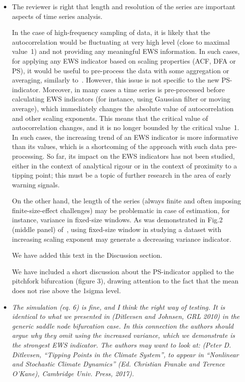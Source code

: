 \documentclass[12pt]{article}
\begin{document}
\begin{itemize}
\item[\bf Response.] 
The reviewer is right that length and resolution of the series are 
important aspects of time series analysis. 

In the case of high-frequency sampling
of data, it is likely that the autocorrelation would be fluctuating 
at very high level (close to maximal value~1) and not providing any 
meaningful EWS information. In such cases, for applying any EWS indicator
based on scaling properties (ACF, DFA or PS), it would be useful to 
pre-process the data with 
some aggregation or averaging, similarly to~\cite{held2004}. 
However, this issue is not specific to the 
new PS-indicator. Moreover, in many cases a time series is pre-processed 
before calculating EWS indicators (for instance, using Gaussian filter
or moving average), which immediately changes the absolute value of
autocorrelation and other scaling exponents. This means that the critical 
value of autocorrelation changes, and it is no longer bounded 
by the critical
value~1. In such cases, the increasing trend of an EWS indicator is more
informative than its values, which is a shortcoming of the approach with 
such data pre-processing. So far, its impact on the EWS 
indicators has not been studied, either in the context of analytical 
rigour or in the context of proximity to a tipping point; 
this must be a topic of further research in the area of 
early warning signals.

On the other hand, the length of the series (always
finite and often imposing finite-size-effect challenges) may be problematic
in case of estimation, for instance, variance in fixed-size windows. 
As was demonstrated in Fig.2 (middle panel) 
of~\cite{livina2012}, using
fixed-size window in studying a dataset with increasing scaling exponent 
may generate a decreasing variance indicator. 

We have added this text in the Discussion section. 

We have included a short discussion about the 
PS-indicator applied to the pitchfork bifurcation (figure 3), 
drawing attention to the fact that the mean does not rise above 
the 1sigma level.

\item[\bf Comment 3.]
{\sl 
The simulation (eq. 6) is fine, and I think the right way of testing. 
It is identical to what we presented in (Ditlevsen and Johnsen, GRL 2010) 
in the generic saddle node bifurcation case. In this connection 
the authors should argue why they omit using the increased variance,
which we demonstrate is the strongest EWS indicator.
The authors may want to look at: (Peter D. Ditlevsen, 
``Tipping Points in the Climate System'', to appear in 
``Nonlinear and Stochastic Climate Dynamics'' 
(Ed. Christian Franzke and Terence O'Kane), Cambridge Univ. Press, 2017).
}


\end{itemize}
\end{document}
